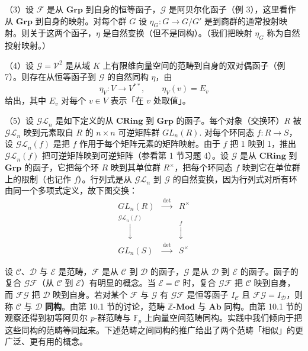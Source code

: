 （3）设 \(\mathcal{F}\) 是从 \(\mathbf{Grp}\) 到自身的恒等函子，\(\mathcal{G}\) 是阿贝尔化函子（例 3），这里看作从 \(\mathbf{Grp}\) 到自身的映射。对每个群 \(G\) 设 \(\eta_G : G \to G/G'\) 是到商群的通常投射映射。则关于这两个函子，\(\eta\) 是自然变换（但不是同构）。（我们把映射 \(\eta_G\) 称为自然投射映射。）

（4）设 \(\mathcal{G} = \mathcal{V}^2\) 是从域 \(K\) 上有限维向量空间的范畴到自身的双对偶函子（例 7）。则存在从恒等函子到 \(\mathcal{G}\) 的自然同构 \(\eta\)，由
\[
\eta_V : V \to V^{**}, \qquad \eta_V(v) = E_v
\]
给出，其中 \(E_v\) 对每个 \(v \in V\) 表示「在 \(v\) 处取值」。

（5）设 \(\mathcal{GL}_n\) 是如下定义的从 \(\mathbf{CRing}\) 到 \(\mathbf{Grp}\) 的函子。每个对象（交换环）\(R\) 被 \(\mathcal{GL}_n\) 映到元素取自 \(R\) 的 \(n \times n\) 可逆矩阵群 \(GL_n(R)\). 对每个环同态 \(f : R \to S\)，设 \(\mathcal{GL}_n(f)\) 是把 \(f\) 作用于每个矩阵元素的矩阵映射。由于 \(f\) 把 1 映到 1，推出 \(\mathcal{GL}_n(f)\) 把可逆矩阵映到可逆矩阵（参看第 1 节习题 4）。设 \(\mathcal{G}\) 是从 \(\mathbf{CRing}\) 到 \(\mathbf{Grp}\) 的函子，它把每个环 \(R\) 映到其单位群 \(R^\times\)，把每个环同态 \(f\) 映到它在单位群上的限制（也记作 \(f\)）。行列式是从 \(\mathcal{GL}_n\) 到 \(\mathcal{G}\) 的自然变换，因为行列式对所有环由同一个多项式定义，故下图交换：
\[
\renewcommand{\arraystretch}{1.6}
\begin{array}{ccc}
GL_n(R) & \xrightarrow{\ \det\ } & R^\times\\
\mathrel{\mathop{\downarrow}\limits^{\scriptstyle \mathcal{GL}_n(f)}} & & \mathrel{\mathop{\downarrow}\limits^{\scriptstyle f}}\\
GL_n(S) & \xrightarrow{\ \det\ } & S^\times
\end{array}
\]

设 \(\mathcal{C}\)、\(\mathcal{D}\) 与 \(\mathcal{E}\) 是范畴，\(\mathcal{F}\) 是从 \(\mathcal{C}\) 到 \(\mathcal{D}\) 的函子，\(\mathcal{G}\) 是从 \(\mathcal{D}\) 到 \(\mathcal{E}\) 的函子。函子的复合 \(\mathcal{GF}\)（从 \(\mathcal{C}\) 到 \(\mathcal{E}\)）有明显的概念。当 \(\mathcal{E} = \mathcal{C}\) 时，复合 \(\mathcal{GF}\) 把 \(\mathcal{C}\) 映到自身，而 \(\mathcal{FG}\) 把 \(\mathcal{D}\) 映到自身。若对某个 \(\mathcal{F}\) 与 \(\mathcal{G}\) 有 \(\mathcal{GF}\) 是恒等函子 \(I_{\mathcal{C}}\) 且 \(\mathcal{FG} = I_{\mathcal{D}}\)，则称 \(\mathcal{C}\) 与 \(\mathcal{D}\) \textbf{同构}。由第 10.1 节的讨论，范畴 \(\mathbb{Z}\text{-}\mathbf{Mod}\) 与 \(\mathbf{Ab}\) 同构。由第 10.1 节的观察还得到初等阿贝尔 \(p\)-群范畴与 \(\mathbb{F}_p\) 上向量空间范畴同构。实践中我们倾向于把这些同构的范畴等同起来。下述范畴之间同构的推广给出了两个范畴「相似」的更广泛、更有用的概念。

